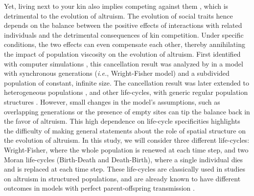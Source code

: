\documentclass[11pt, letterpaper]{article}
\newcommand{\ie}{\textit{i.e.}}
\newcommand{\eg}{\textit{e.g.}}
\begin{document}
Yet, living next to your kin also implies competing against them \citep{West2002}, which is detrimental to the evolution of altruism. The evolution of social traits hence depends on the balance between the positive effects of interactions with related individuals and the detrimental consequences of kin competition. Under specific conditions, the two effects can even compensate each other, thereby annihilating the impact of population viscosity on the evolution of altruism. 
First identified with computer simulations \citep{Wilson1992}, this cancellation result was analyzed by \citet{Taylor1992islandmodel} in a model with synchronous generations (\ie, Wright-Fisher model) and a subdivided population of constant, infinite size. The cancellation result was later extended to heterogeneous populations \citep[][with synchronous generations and infinite population size]{RodriguesGardner2012}, and other life-cycles, with generic regular population structures \citep[][with synchronous generations but also with continuous generations and Birth-Death updating]{Taylor2011}. However, small changes in the model's assumptions, such as overlapping generations \citep{TaylorIrwin2000} or the presence of empty sites \citep{Alizon2008} can tip the balance back in the favor of altruism. 
This high dependence on life-cycle specificities highlights the difficulty of making general statements about the role of spatial structure on the evolution of altruism. 
In this study, we will consider three different life-cycles: Wright-Fisher, where the whole population is renewed at each time step, and two Moran life-cycles (Birth-Death and Death-Birth), where a single individual dies and is replaced at each time step. These life-cycles are classically used in studies on altruism in structured populations, and are already known to have different outcomes in models with perfect parent-offspring transmission \citep[\eg,][]{Taylor1992islandmodel, Rousset2004Book,Ohtsuki2006, Lehmann2007, Taylor2010}. 
\end{document}

